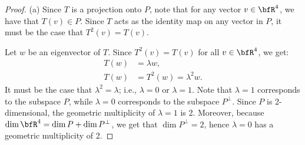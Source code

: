 \documentclass[10pt,twoside,openany]{memoir}
\begin{document}
    \begin{proof}
        (a) Since $T$ is a projection onto $P$, note that for any vector $v \in \bfR^4$, we have that $T(v) \in P$. Since $T$ acts as the identity map on any vector in $P$, it must be the case that $T^2(v) = T(v)$. 

        Let $w$ be an eigenvector of $T$. Since $T^2(v) = T(v)$ for all $v \in \bfR^4$, we get:
            \begin{equation*}
            \begin{split}
                T(w) &= \lambda w, \\
                T(w) & = T^2(w)  = \lambda^2 w.
            \end{split}
            \end{equation*}
        It must be the case that $\lambda^2 = \lambda$; i.e., $\lambda = 0$ or $\lambda = 1$. Note that $\lambda = 1$ corresponds to the subspace $P$, while $\lambda = 0$ corresponds to the subspace $P^\perp$. Since $P$ is 2-dimensional, the geometric multiplicity of $\lambda = 1$ is 2. Moreover, because $\dim \bfR^4 = \dim P + \dim P^\perp$, we get that $\dim P^\perp = 2$, hence $\lambda = 0$ has a geometric multiplicity of 2.


\end{proof}
\end{document}

